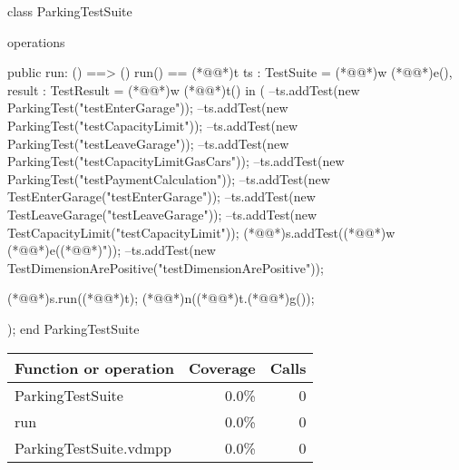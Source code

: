 \documentclass[a4paper]{article}
\begin{document}
\title{}
\author{}
\begin{vdm_al}
class ParkingTestSuite

operations
    
    public run: () ==> ()
    run() ==
        (*@@*)t ts : TestSuite = (*@@*)w (*@@*)e(),
            result : TestResult = (*@@*)w (*@@*)t() 
        in
        (
            --ts.addTest(new ParkingTest("testEnterGarage"));
            --ts.addTest(new ParkingTest("testCapacityLimit"));
            --ts.addTest(new ParkingTest("testLeaveGarage"));
            --ts.addTest(new ParkingTest("testCapacityLimitGasCars"));
            --ts.addTest(new ParkingTest("testPaymentCalculation"));
            --ts.addTest(new TestEnterGarage("testEnterGarage"));
            --ts.addTest(new TestLeaveGarage("testLeaveGarage"));
            --ts.addTest(new TestCapacityLimit("testCapacityLimit"));
            (*@@*)s.addTest((*@@*)w (*@@*)e((*@@*)"));
            --ts.addTest(new TestDimensionArePositive("testDimensionArePositive"));
            
            
            (*@@*)s.run((*@@*)t);
            (*@@*)n((*@@*)t.(*@@*)g());
        
        );
end ParkingTestSuite
\end{vdm_al}
\bigskip
\begin{longtable}{|l|r|r|}
\hline
Function or operation & Coverage & Calls \\
\hline
\hline
ParkingTestSuite & 0.0\% & 0 \\
\hline
run & 0.0\% & 0 \\
\hline
\hline
ParkingTestSuite.vdmpp & 0.0\% & 0 \\
\hline
\end{longtable}
\end{document}
